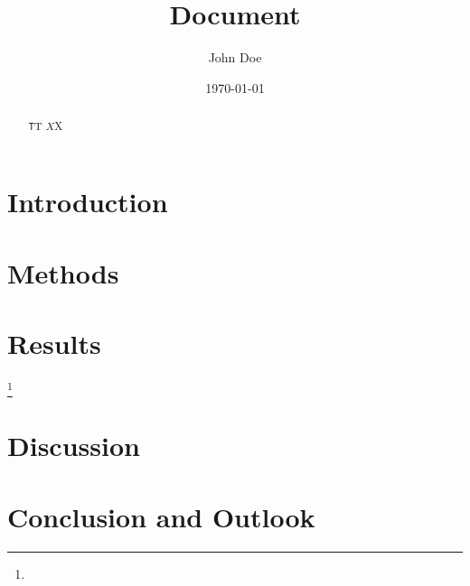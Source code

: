 \def\bibpath{references.bib}
\def\myfont{charter} %
	


\title{Document}
\author{John Doe}
\date{\today}



\maketitle

\begin{abstract}
	\blindtext

	\texttt{T}T $X$X
\end{abstract}

\section{Introduction}


\blindmathpaper\cite{schurmann_konstruieren_2007}


\section{Methods}

\Blindtext

\section{Results}

\Blindtext\footnote{\blindtext}

\section{Discussion}

\blindtext\cite{wachter_angewandter_2017}

\section{Conclusion and Outlook}

\blindtext


\appendix

\printbibliography


